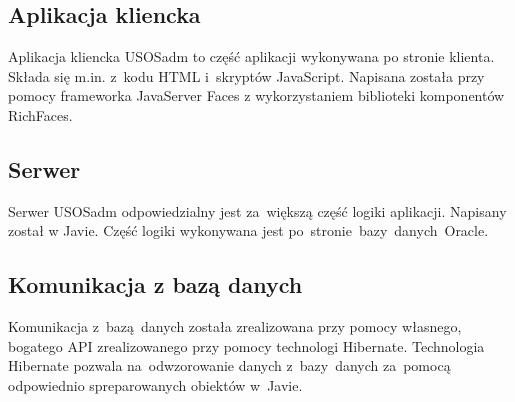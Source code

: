 \documentclass[licencjacka]{pracamgr}
\begin{document}
\subsection{Aplikacja kliencka}
Aplikacja kliencka USOSadm to część aplikacji wykonywana po stronie klienta. Składa się m.in. z~kodu HTML i~skryptów JavaScript. Napisana została przy pomocy frameworka JavaServer Faces z wykorzystaniem biblioteki komponentów RichFaces.

\subsection{Serwer}
Serwer USOSadm odpowiedzialny jest za~większą część logiki aplikacji. Napisany został w Javie. Część logiki wykonywana jest po~stronie~bazy~danych~Oracle.

\subsection{Komunikacja z bazą danych}
Komunikacja z~bazą~danych została zrealizowana przy pomocy własnego, bogatego API zrealizowanego przy pomocy technologi Hibernate. Technologia Hibernate pozwala na~odwzorowanie danych z~bazy~danych za~pomocą odpowiednio spreparowanych obiektów w~Javie.
\end{document}
